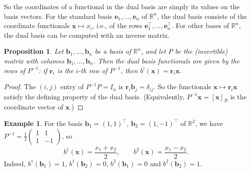 \documentclass[11pt]{article}
\theoremstyle{definition}
\newtheorem{example}[definition]{Example}
\theoremstyle{plain}
\newtheorem{proposition}[definition]{Proposition}
\theoremstyle{remark}
\begin{document}
So the coordinates of a functional in the dual basis are simply its values on the basis vectors. For the standard basis $\mathbf{e}_1, \ldots, \mathbf{e}_n$ of $\mathbb{R}^n$, the dual basis consists of the coordinate functionals $\mathbf{x} \mapsto x_i$, i.e., of the rows $\mathbf{e}_1^\top, \ldots, \mathbf{e}_n^\top$. For other bases of $\mathbb{R}^n$, the dual basis can be computed with an inverse matrix.

\begin{proposition}\label{prop:dual-basis-compute}
    Let $\mathbf{b}_1, \ldots, \mathbf{b}_n$ be a basis of $\mathbb{R}^n$, and let $P$ be the (invertible) matrix with columns $\mathbf{b}_1, \ldots, \mathbf{b}_n$. Then the dual basis functionals are given by the rows of $P^{-1}$: if $\mathbf{r}_i$ is the $i$-th row of $P^{-1}$, then $b^i(\mathbf{x}) = \mathbf{r}_i \mathbf{x}$.
\end{proposition}

\begin{proof}
    The $(i, j)$ entry of $P^{-1}P = I_n$ is $\mathbf{r}_i \mathbf{b}_j = \delta_{ij}$. So the functionals $\mathbf{x} \mapsto \mathbf{r}_i \mathbf{x}$ satisfy the defining property of the dual basis. (Equivalently, $P^{-1}\mathbf{x} = [\mathbf{x}]_{\mathcal{B}}$ is the coordinate vector of $\mathbf{x}$.)
\end{proof}

\begin{example}
    For the basis $\mathbf{b}_1 = (1, 1)^\top$, $\mathbf{b}_2 = (1, -1)^\top$ of $\mathbb{R}^2$, we have $P^{-1} = \frac{1}{2}\begin{pmatrix} 1 & 1 \\ 1 & -1 \end{pmatrix}$, so
    \[b^1(\mathbf{x}) = \frac{x_1 + x_2}{2}, \qquad b^2(\mathbf{x}) = \frac{x_1 - x_2}{2}.\]
    Indeed, $b^1(\mathbf{b}_1) = 1$, $b^1(\mathbf{b}_2) = 0$, $b^2(\mathbf{b}_1) = 0$ and $b^2(\mathbf{b}_2) = 1$.
\end{example}
\end{document}
